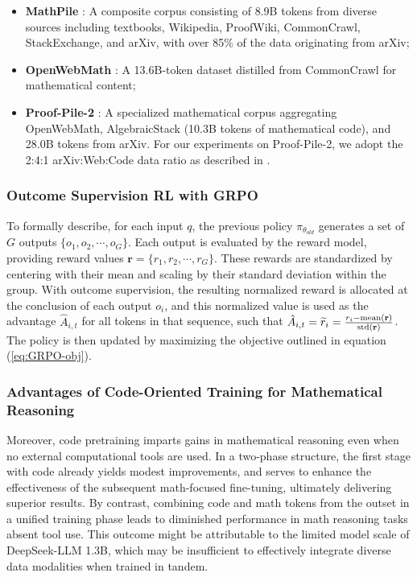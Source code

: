 \begin{itemize}[topsep=0pt]
    \item \textbf{MathPile} \citep{mathpile}: A composite corpus consisting of 8.9B tokens from diverse sources including textbooks, Wikipedia, ProofWiki, CommonCrawl, StackExchange, and arXiv, with over 85\% of the data originating from arXiv;
    \item \textbf{OpenWebMath} \citep{openwebmath}: A 13.6B-token dataset distilled from CommonCrawl for mathematical content;
    \item \textbf{Proof-Pile-2} \citep{llemma}: A specialized mathematical corpus aggregating OpenWebMath, AlgebraicStack (10.3B tokens of mathematical code), and 28.0B tokens from arXiv. For our experiments on Proof-Pile-2, we adopt the 2:4:1 arXiv:Web:Code data ratio as described in \cite{llemma}.
\end{itemize}

\subsubsection{Outcome Supervision RL with GRPO} 
To formally describe, for each input $q$, the previous policy $\pi_{\theta_{old}}$ generates a set of $G$ outputs $\{o_1, o_2, \cdots, o_G\}$. Each output is evaluated by the reward model, providing reward values $\mathbf{r}=\{r_1, r_2, \cdots, r_G\}$. These rewards are standardized by centering with their mean and scaling by their standard deviation within the group. With outcome supervision, the resulting normalized reward is allocated at the conclusion of each output $o_i$, and this normalized value is used as the advantage $\hat{A}_{i, t}$ for all tokens in that sequence, such that $\hat{A}_{i, t} = \widetilde{r}_i = \frac{r_i- {\rm mean}(\mathbf{r})}{{\rm std}(\mathbf{r})}$. The policy is then updated by maximizing the objective outlined in equation (\ref{eq:GRPO-obj}).

\subsubsection{Advantages of Code-Oriented Training for Mathematical Reasoning}

Moreover, code pretraining imparts gains in mathematical reasoning even when no external computational tools are used. In a two-phase structure, the first stage with code already yields modest improvements, and serves to enhance the effectiveness of the subsequent math-focused fine-tuning, ultimately delivering superior results. By contrast, combining code and math tokens from the outset in a unified training phase leads to diminished performance in math reasoning tasks absent tool use. This outcome might be attributable to the limited model scale of DeepSeek-LLM 1.3B, which may be insufficient to effectively integrate diverse data modalities when trained in tandem.

